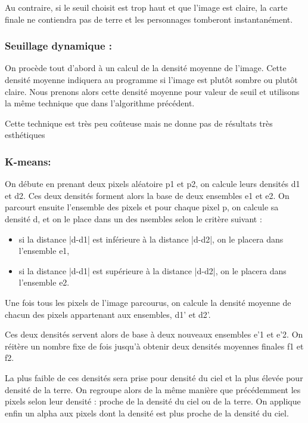 \documentclass{report}
\begin{document}
Au contraire, si le seuil choisit est trop
haut et que l’image est claire, la carte finale ne contiendra pas de
terre et les personnages tomberont instantanément.

\subsubsection{Seuillage dynamique :}

On procède tout d’abord à un calcul de la densité moyenne de l’image.
Cette densité moyenne indiquera au programme si l’image est plutôt
sombre ou plutôt claire. Nous prenons alors cette densité moyenne pour
valeur de seuil et utilisons la même technique que dans l’algorithme
précédent.
\bigskip

Cette technique est très peu coûteuse mais ne donne pas de résultats
très esthétiques

\subsubsection{K-means:}

On débute en prenant deux pixels aléatoire p1 et p2, on calcule leurs
densités d1 et d2. Ces deux densités forment alors la base de deux
ensembles e1 et e2. On parcourt ensuite l’ensemble des pixels et pour
chaque pixel p, on calcule sa densité d, et on le place dans un des
nsembles selon le critère suivant :
\bigskip

\begin{itemize}
\item si la distance |d-d1| est inférieure à la distance |d-d2|, on le
placera dans l’ensemble e1,
\item si la distance |d-d1| est supérieure à la distance |d-d2|, on le
placera dans l’ensemble e2.
\end{itemize}
\bigskip

Une fois tous les pixels de l’image parcourus, on calcule la densité
moyenne de chacun des pixels appartenant aux ensembles, d1’ et d2’.

Ces deux densités servent alors de base à deux nouveaux ensembles e’1 et e’2.
On réitère un nombre fixe de fois jusqu’à obtenir deux densités moyennes
finales f1 et f2.

La plus faible de ces densités sera prise pour densité
du ciel et la plus élevée pour densité de la terre. On regroupe alors de
la même manière que précédemment les pixels selon leur densité : proche
de la densité du ciel ou de la terre. On applique enfin un alpha aux
pixels dont la densité est plus proche de la densité du ciel.
\bigskip
\end{document}
